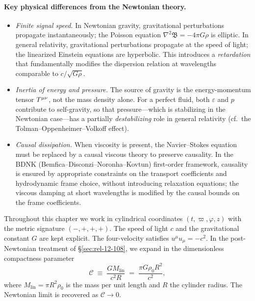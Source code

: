 \paragraph{Key physical differences from the Newtonian theory.}
\begin{itemize}
\item \emph{Finite signal speed.}  In Newtonian gravity, gravitational
  perturbations propagate instantaneously; the Poisson equation
  $\nabla^{2}\mathfrak{B} = -4\pi G\rho$ is elliptic.  In general
  relativity, gravitational perturbations propagate at the speed of
  light; the linearized Einstein equations are hyperbolic.  This
  introduces a \emph{retardation} that fundamentally modifies the
  dispersion relation at wavelengths comparable to $c/\sqrt{G\rho}$.

\item \emph{Inertia of energy and pressure.}  The source of gravity is
  the energy-momentum tensor $T^{\mu\nu}$, not the mass density alone.  For a
  perfect fluid, both $\varepsilon$ and $p$ contribute to self-gravity,
  so that pressure---which is stabilizing in the Newtonian case---has a
  partially \emph{destabilizing} role in general relativity (cf.\ the
  Tolman--Oppenheimer--Volkoff effect).

\item \emph{Causal dissipation.}  When viscosity is present, the
  Navier--Stokes equation must be replaced by a causal viscous
  theory to preserve causality.  In the BDNK (Bemfica--Disconzi--Noronha--Kovtun)
  first-order framework, causality is ensured by appropriate constraints
  on the transport coefficients and hydrodynamic frame choice, without
  introducing relaxation equations; the viscous damping at short
  wavelengths is modified by the causal bounds on the frame coefficients.
\end{itemize}

Throughout this chapter we work in cylindrical coordinates
$(t,\varpi,\varphi,z)$ with the metric signature $(-,+,+,+)$.  The
speed of light $c$ and the gravitational constant $G$ are kept explicit.
The four-velocity satisfies $u^{\mu}u_{\mu}=-c^{2}$.  In the
post-Newtonian treatment of \S\ref{sec:rel-12-108}, we expand in the
dimensionless compactness parameter
\begin{equation}
\label{eq:rel-12-1}
\mathcal{C} \;\equiv\; \frac{G M_{\mathrm{lin}}}{c^{2} R}
  \;=\; \frac{\pi G \rho_{0} R^{2}}{c^{2}},
\end{equation}
where $M_{\mathrm{lin}} = \pi R^{2}\rho_{0}$ is the mass per unit
length and $R$ the cylinder radius.  The Newtonian limit is recovered as
$\mathcal{C}\to 0$.

